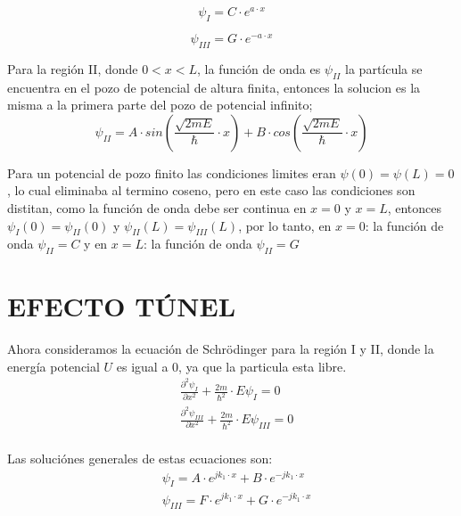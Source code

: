 \documentclass[a4paper]{article}
\begin{document}
            \begin{equation}
                \psi_I = C \cdot e^{a \cdot x}
            \end{equation}

            \begin{equation}
                \psi_{III} = G \cdot e^{-a \cdot x} 
            \end{equation}

            \indent Para la región II, donde $0 < x < L$, la función de onda es $\psi_{II}$
            la partícula se encuentra en el pozo de potencial de altura finita, entonces la solucion es la misma a la primera parte del pozo de potencial infinito;\\

            \begin{equation}
                \psi_{II} = A \cdot sin(\frac{\sqrt{2mE}}{\hbar} \cdot x) + B \cdot cos(\frac{\sqrt{2mE}}{\hbar} \cdot x)
            \end{equation}

            \indent Para un potencial de pozo finito las condiciones limites eran $\psi(0) = \psi(L) = 0$, lo cual eliminaba al termino coseno, pero en este caso las condiciones son distitan, como la función de onda debe ser continua en $x = 0$ y $x = L$, entonces $\psi_I(0) = \psi_{II}(0)$ y $\psi_{II}(L) = \psi_{III}(L)$, por lo tanto, en $x = 0$: la función de onda $\psi_{II} = C$ y en $x = L$: la función de onda $\psi_{II} = G$

    \section{EFECTO TÚNEL}
        \indent Ahora consideramos la ecuación de Schrödinger para la región I y II, donde la energía potencial $U$ es igual a $0$, ya que la particula esta libre.
        \begin{align*}
                &\frac{\partial^2 \psi_I} {\partial x^2} + \frac{2m}{\hbar^2} \cdot E \psi_I = 0 \\
                &\frac{\partial^2 \psi_{III}} {\partial x^2} + \frac{2m}{\hbar^2} \cdot E \psi_{III} = 0 \\
            \end{align*}

            \indent Las soluciónes generales de estas ecuaciones son:
             \begin{align*}
                &\psi_I = A \cdot e^{jk_1 \cdot x} + B \cdot e^{-jk_1 \cdot x} \\
                &\psi_{III} = F \cdot e^{jk_1 \cdot x} + G \cdot e^{-jk_1 \cdot x} \\
            \end{align*}
\end{document}
